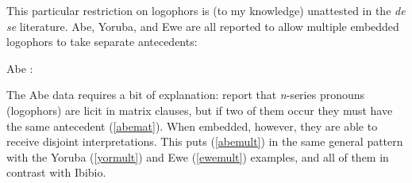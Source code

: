 \documentclass[output=paper]{langscibook}
\begin{document}
This particular restriction on logophors is (to my knowledge) unattested in the \textit{de se} literature. Abe, Yoruba, and Ewe are all reported to allow multiple embedded logophors to take separate antecedents:
\begin{exe}
	\ex Abe \citep[41, 44a]{Koopman1989}: \begin{xlist} 
		\label{abemat}
	\label{abemult}
			\end{xlist}
			
	\label{yormult}
			
	\label{ewemult}
\end{exe}
The Abe data requires a bit of explanation: \citet{Koopman1989} report that \textit{n}-series pronouns (logophors) are licit in matrix clauses, but if two of them occur they must have the same antecedent (\ref{abemat}). When embedded, however, they are able to receive disjoint interpretations. This puts (\ref{abemult}) in the same general pattern with the Yoruba (\ref{yormult}) and Ewe (\ref{ewemult}) examples, and all of them in contrast with Ibibio.
\end{document}
